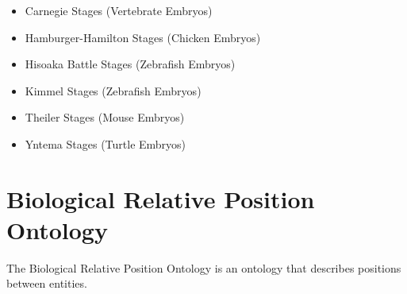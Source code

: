 \begin{itemize}
\item Carnegie Stages\cite{CarnegieStage}
  (Vertebrate Embryos)
\item Hamburger-Hamilton
  Stages\cite{HamburgerHamiltonStage}
  (Chicken Embryos)
\item Hisoaka Battle
  Stages\cite{HisaokaBattleStage}
  (Zebrafish Embryos)
\item Kimmel Stages\cite{KimmelStage} (Zebrafish
  Embryos)
\item Theiler Stages\cite{TheilerStage} (Mouse
  Embryos)
\item Yntema Stages\cite{YntemaStage} (Turtle
  Embryos)
\end{itemize}



\section{Biological Relative Position Ontology}

The Biological Relative Position Ontology is an ontology that describes
positions between entities.
